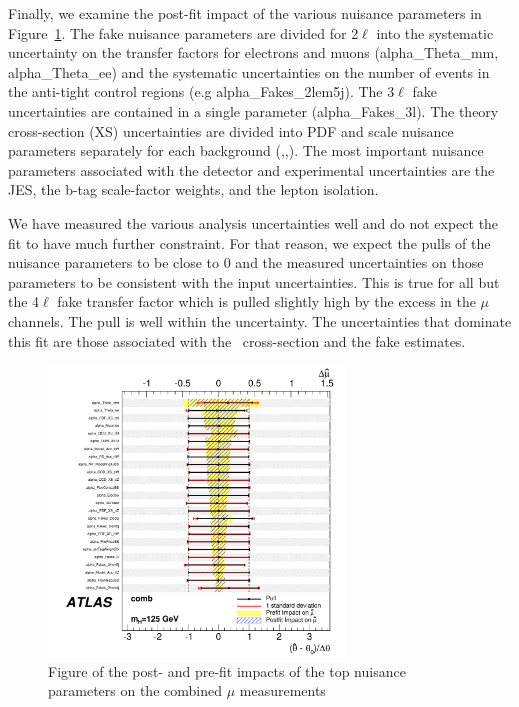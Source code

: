 Finally, we examine the post-fit impact of the various nuisance parameters in Figure~\ref{figure:results_nuisance}.  The fake nuisance parameters are divided for 2$\ell$ into the systematic uncertainty on the transfer factors for electrons and muons (alpha\_Theta\_mm, alpha\_Theta\_ee) and the systematic uncertainties on the number of events in the anti-tight control regions (e.g alpha\_Fakes\_2lem5j). The 3$\ell$ fake uncertainties are contained in a single parameter (alpha\_Fakes\_3l). The theory cross-section (XS) uncertainties are divided into PDF and scale nuisance parameters separately for each background (\ttW,\ttZ,\tth). The most important nuisance parameters associated with the detector and experimental uncertainties are the JES, the b-tag scale-factor weights, and the lepton isolation.  

We have measured the various analysis uncertainties well and do not expect the fit to have much further constraint. For that reason, we expect the pulls of the nuisance parameters to be close to 0 and the measured uncertainties on those parameters to be consistent with the input uncertainties. This is true for all but the 4$\ell$ fake transfer factor which is pulled slightly high by the excess in the $\mu$ channels. The pull is well within the uncertainty. The uncertainties that dominate this fit are those associated with the \ttV\ cross-section and the fake estimates. 

\begin{figure}[htbp]
\begin{center}
\includegraphics[width=0.7\textwidth]{figs/results/nuisance.pdf}
\caption{Figure of the post- and pre-fit impacts of the top nuisance parameters on the combined $\mu$ measurements}
\label{figure:results_nuisance}
\end{center}
\end{figure}



